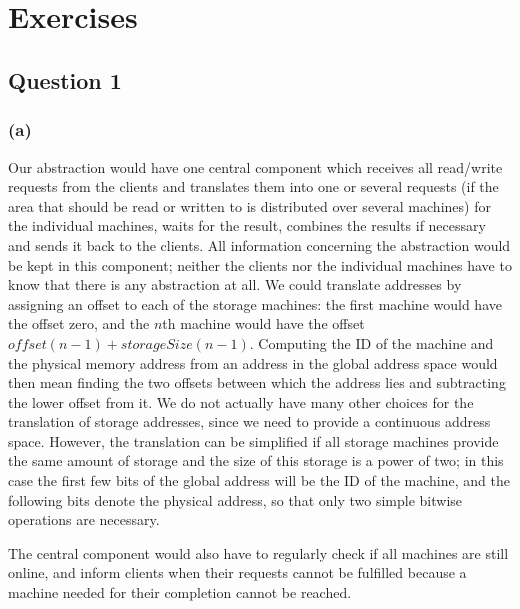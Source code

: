 \documentclass[12pt,a4paper]{article}
\begin{document}
\title{\Module\\\Uebung}
\author{\Studentenname}
\maketitle

\section*{Exercises} 
\label{sec:exercises}

\subsection*{Question 1}
\label{sec:eq1}
\subsubsection*{(a)}
Our abstraction would have one central component which receives all read/write requests from the clients and translates them into one or several requests (if the area that should be read or written to is distributed over several machines) for the individual machines, waits for the result, combines the results if necessary and sends it back to the clients. All information concerning the abstraction would be kept in this component; neither the clients nor the individual machines have to know that there is any abstraction at all. We could translate addresses by assigning an offset to each of the storage machines: the first machine would have the offset zero, and the $n$th machine would have the offset $offset(n-1) + storageSize(n-1)$. Computing the ID of the machine and the physical memory address from an address in the global address space would then mean finding the two offsets between which the address lies and subtracting the lower offset from it.
We do not actually have many other choices for the translation of storage addresses, since we need to provide a continuous address space.
However, the translation can be simplified if all storage machines provide the same amount of storage and the size of this storage is a power of two; in this case the first few bits of the global address will be the ID of the machine, and the following bits denote the physical address, so that only two simple bitwise operations are necessary.

The central component would also have to regularly check if all machines are still online, and inform clients when their requests cannot be fulfilled because a machine needed for their completion cannot be reached. 
\end{document}

